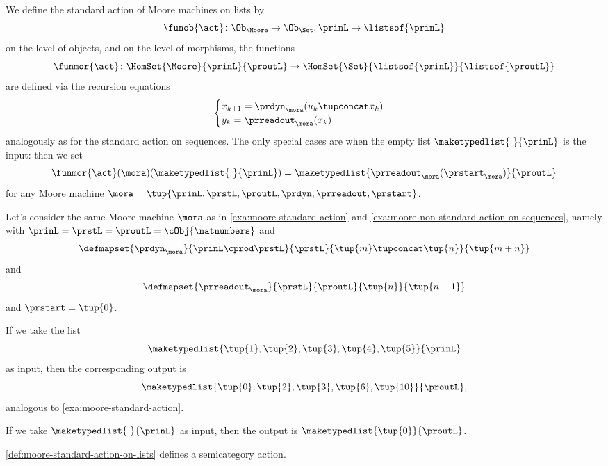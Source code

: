 \begin{definition}
\label{def:moore-standard-action-on-lists}
We define the standard action of Moore machines on lists by 
\begin{equation}
\funob{\act} \colon \Ob_{\Moore} \to \Ob_{\Set}, \prinL \mapsto \listsof{\prinL}
\end{equation}
on the level of objects, and on the level of morphisms, the functions 
\begin{equation}
\funmor{\act} \colon  \HomSet{\Moore}{\prinL}{\proutL} \to \HomSet{\Set}{ \listsof{\prinL}}{\listsof{\proutL}}
\end{equation}
are defined via the recursion equations
\begin{equation}
    \begin{cases}
        x_{k+1} = \prdyn_\mora(u_k \tupconcat x_k) \\
        y_{k}   = \prreadout_\mora(x_{k})
    \end{cases}
\end{equation}
analogously as for the standard action on sequences. The only special cases are when the empty list $\maketypedlist{\ }{\prinL}$ is the input: then we set 
\begin{equation}
\funmor{\act}(\mora)(\maketypedlist{\ }{\prinL}) = \maketypedlist{ \prreadout_\mora(\prstart_\mora) }{\proutL}
\end{equation}
for any Moore machine $\mora = \tup{\prinL,\prstL,\proutL,\prdyn,\prreadout,\prstart}$.
\end{definition}

\begin{example}
\label{exa:moore-non-standard-action-on-lists}
Let's consider the same Moore machine $\mora$ as in \cref{exa:moore-standard-action} and \cref{exa:moore-non-standard-action-on-sequences}, namely with $\prinL = \prstL = \proutL = \cObj{\natnumbers}$
and 
\begin{equation}
\defmapset{
\prdyn_\mora
}{
\prinL \cprod \prstL
}{
\prstL
}{
\tup{m} \tupconcat \tup{n}
}{
\tup{m + n}
}
\end{equation}
and 
\begin{equation}
\defmapset{
\prreadout_\mora
}{
\prstL
}{
\proutL
}{
\tup{n}
}{
\tup{n+1}
}
\end{equation}
and $\prstart = \tup{0}$. 

If we take the list 
$$
\maketypedlist{\tup{1}, \tup{2}, \tup{3}, \tup{4}, \tup{5}}{\prinL}
$$
as input, then the corresponding output is 
$$
\maketypedlist{\tup{0}, \tup{2}, \tup{3}, \tup{6}, \tup{10}}{\proutL},
$$
analogous to \cref{exa:moore-standard-action}. 

If we take $\maketypedlist{\ }{\prinL}$ as input, then the output is $\maketypedlist{\tup{0}}{\proutL}$.
\end{example}



\begin{lemma}
\cref{def:moore-standard-action-on-lists} defines a semicategory action. 
\end{lemma}





